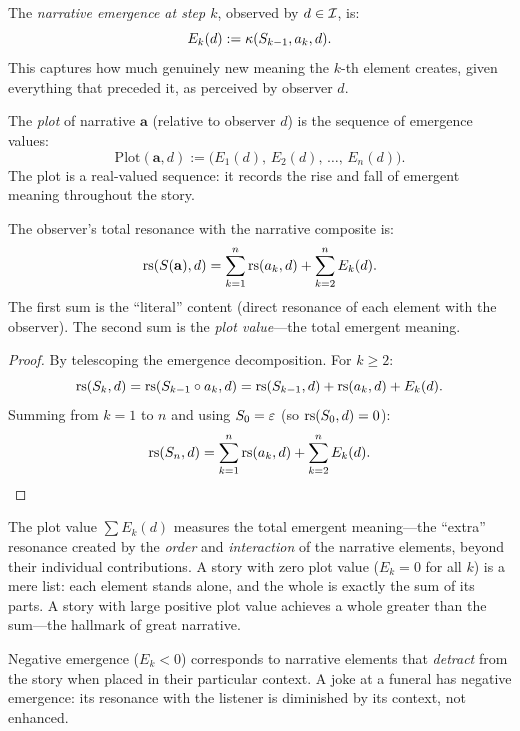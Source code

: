 \begin{definition}
\label{def:narrative-emergence}
The \emph{narrative emergence at step $k$}, observed by $d \in \mathcal{I}$, is:
\[
  E_k(d) := \kappa(S_{k-1}, a_k, d).
\]
This captures how much genuinely new meaning the $k$-th element creates,
given everything that preceded it, as perceived by observer $d$.
\end{definition}

\begin{definition}[Plot]
\label{def:plot}
The \emph{plot} of narrative $\mathbf{a}$ (relative to observer $d$) is the
sequence of emergence values:
\[
  \text{Plot}(\mathbf{a}, d) := \bigl(E_1(d),\, E_2(d),\, \ldots,\, E_n(d)\bigr).
\]
The plot is a real-valued sequence: it records the rise and fall of emergent
meaning throughout the story.
\end{definition}

\begin{theorem}
\label{thm:plot-resonance}
The observer's total resonance with the narrative composite is:
\[
  \mathrm{rs}(S(\mathbf{a}), d) = \sum_{k=1}^{n} \mathrm{rs}(a_k, d)
  + \sum_{k=2}^{n} E_k(d).
\]
The first sum is the ``literal'' content (direct resonance of each element
with the observer).  The second sum is the \emph{plot value}---the total
emergent meaning.
\end{theorem}

\begin{proof}
By telescoping the emergence decomposition.  For $k \geq 2$:
\[
  \mathrm{rs}(S_k, d) = \mathrm{rs}(S_{k-1} \circ a_k, d)
  = \mathrm{rs}(S_{k-1}, d) + \mathrm{rs}(a_k, d) + E_k(d).
\]
Summing from $k = 1$ to $n$ and using $S_0 = \varepsilon$ (so $\mathrm{rs}(S_0, d) = 0$):
\[
  \mathrm{rs}(S_n, d) = \sum_{k=1}^n \mathrm{rs}(a_k, d) + \sum_{k=2}^n E_k(d). \qedhere
\]
\end{proof}

\begin{interpretation}
\label{interp:plot}
The plot value $\sum E_k(d)$ measures the total emergent meaning---the
``extra'' resonance created by the \emph{order} and \emph{interaction} of the
narrative elements, beyond their individual contributions.  A story with zero
plot value ($E_k = 0$ for all $k$) is a mere list: each element stands alone,
and the whole is exactly the sum of its parts.  A story with large positive
plot value achieves a whole greater than the sum---the hallmark of great
narrative.

Negative emergence ($E_k < 0$) corresponds to narrative elements that
\emph{detract} from the story when placed in their particular context.  A
joke at a funeral has negative emergence: its resonance with the listener is
diminished by its context, not enhanced.
\end{interpretation}

